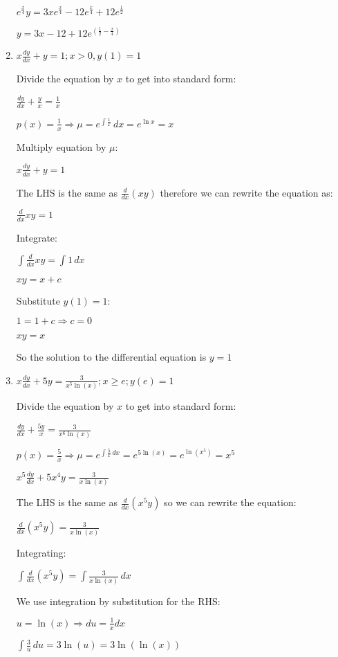 \documentclass[../main.tex]{subfiles}
\begin{document}
\begin{enumerate}[itemsep=0.7cm]
    $e^{\frac{x}{4}}y=3xe^{\frac{x}{4}}-12e^{\frac{x}{4}}+12e^{\frac{1}{2}}$

    $y=3x-12+12e^{(\frac{1}{2}-\frac{x}{4})}$

    \item 
    $x\frac{dy}{dx}+y=1; x>0, y(1)=1$

    Divide the equation by $x$ to get into standard form:

    $\frac{dy}{dx}+\frac{y}{x}=\frac{1}{x}$

    $p(x)=\frac{1}{x} \Rightarrow \mu=e^{\int \frac{1}{x}}\,dx=e^{\ln{x}}=x$

    Multiply equation by $\mu$:

    $x\frac{dy}{dx}+y=1$

    The LHS is the same as $\frac{d}{dx}(xy)$ therefore we can rewrite the equation as:

    $\frac{d}{dx}xy=1$

    Integrate:

    $\int \frac{d}{dx}xy=\int 1\,dx$

    $xy=x+c$

    Substitute $y(1)=1$:

    $1=1+c \Rightarrow c=0$

    $xy=x$

    So the solution to the differential equation is $y=1$

    \item 
    $x\frac{dy}{dx}+5y=\frac{3}{x^5 \ln{(x)}}; x\geq e; y(e)=1$

    Divide the equation by $x$ to get into standard form:

    $\frac{dy}{dx}+\frac{5y}{x}=\frac{3}{x^6\ln{(x)}}$

    $p(x)=\frac{5}{x} \Rightarrow \mu=e^{\int \frac{5}{x}\,dx}=e^{5\ln{(x)}}=e^{\ln{(x^5)}}=x^5$

    $x^5\frac{dy}{dx}+5x^4y=\frac{3}{x\ln{(x)}}$

    The LHS is the same as $\frac{d}{dx}(x^5y)$ so we can rewrite the equation:

    $\frac{d}{dx}(x^5y)=\frac{3}{x\ln{(x)}}$

    Integrating:

    $\int \frac{d}{dx}(x^5y)=\int \frac{3}{x\ln{(x)}}\,dx$

    We use integration by substitution for the RHS:

    $u=\ln{(x)} \Rightarrow du=\frac{1}{x}dx$

    $\int \frac{3}{u}\,du=3\ln{(u)}=3\ln{(\ln{(x)})}$


\end{enumerate}
\end{document}
